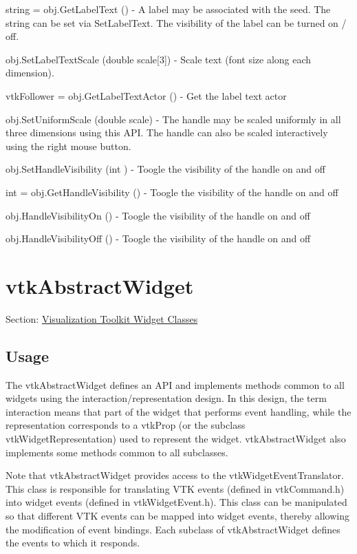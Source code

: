 \begin{DoxyItemize}
\item {\ttfamily string = obj.\-Get\-Label\-Text ()} -\/ A label may be associated with the seed. The string can be set via Set\-Label\-Text. The visibility of the label can be turned on / off.  
\item {\ttfamily obj.\-Set\-Label\-Text\-Scale (double scale\mbox{[}3\mbox{]})} -\/ Scale text (font size along each dimension).  
\item {\ttfamily vtk\-Follower = obj.\-Get\-Label\-Text\-Actor ()} -\/ Get the label text actor  
\item {\ttfamily obj.\-Set\-Uniform\-Scale (double scale)} -\/ The handle may be scaled uniformly in all three dimensions using this A\-P\-I. The handle can also be scaled interactively using the right mouse button.  
\item {\ttfamily obj.\-Set\-Handle\-Visibility (int )} -\/ Toogle the visibility of the handle on and off  
\item {\ttfamily int = obj.\-Get\-Handle\-Visibility ()} -\/ Toogle the visibility of the handle on and off  
\item {\ttfamily obj.\-Handle\-Visibility\-On ()} -\/ Toogle the visibility of the handle on and off  
\item {\ttfamily obj.\-Handle\-Visibility\-Off ()} -\/ Toogle the visibility of the handle on and off  
\end{DoxyItemize}\hypertarget{vtkwidgets_vtkabstractwidget}{}\section{vtk\-Abstract\-Widget}\label{vtkwidgets_vtkabstractwidget}
Section\-: \hyperlink{sec_vtkwidgets}{Visualization Toolkit Widget Classes} \hypertarget{vtkwidgets_vtkxyplotwidget_Usage}{}\subsection{Usage}\label{vtkwidgets_vtkxyplotwidget_Usage}
The vtk\-Abstract\-Widget defines an A\-P\-I and implements methods common to all widgets using the interaction/representation design. In this design, the term interaction means that part of the widget that performs event handling, while the representation corresponds to a vtk\-Prop (or the subclass vtk\-Widget\-Representation) used to represent the widget. vtk\-Abstract\-Widget also implements some methods common to all subclasses.

Note that vtk\-Abstract\-Widget provides access to the vtk\-Widget\-Event\-Translator. This class is responsible for translating V\-T\-K events (defined in vtk\-Command.\-h) into widget events (defined in vtk\-Widget\-Event.\-h). This class can be manipulated so that different V\-T\-K events can be mapped into widget events, thereby allowing the modification of event bindings. Each subclass of vtk\-Abstract\-Widget defines the events to which it responds.

